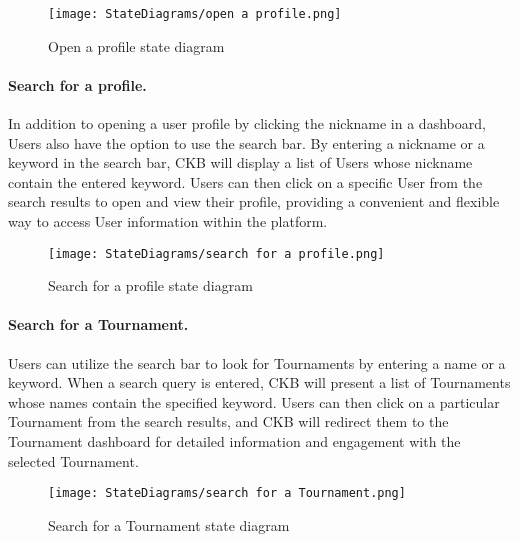 \begin{figure}[H]
    \begin{center}
        \texttt{[image: StateDiagrams/open a profile.png]}
        \caption{Open a profile state diagram}
        \label{fig:open_profile_sd}%
    \end{center}
\end{figure}

\paragraph{Search for a profile.}
In addition to opening a user profile by clicking the nickname in a dashboard, Users also have the option to use the search bar. By entering a nickname or a keyword in the search bar, CKB will display a list of Users whose nickname contain the entered keyword. Users can then click on a specific User from the search results to open and view their profile, providing a convenient and flexible way to access User information within the platform.

\begin{figure}[H]
    \begin{center}
        \texttt{[image: StateDiagrams/search for a profile.png]}
        \caption{Search for a profile state diagram}
        \label{fig:search_profile_sd}%
    \end{center}
\end{figure}

\paragraph{Search for a Tournament.}
Users can utilize the search bar to look for Tournaments by entering a name or a keyword. When a search query is entered, CKB will present a list of Tournaments whose names contain the specified keyword. Users can then click on a particular Tournament from the search results, and CKB will redirect them to the Tournament dashboard for detailed information and engagement with the selected Tournament. 

\begin{figure}[H]
    \begin{center}
        \texttt{[image: StateDiagrams/search for a Tournament.png]}
        \caption{Search for a Tournament state diagram}
        \label{fig:search_Tournament_sd}%
    \end{center}
\end{figure}

